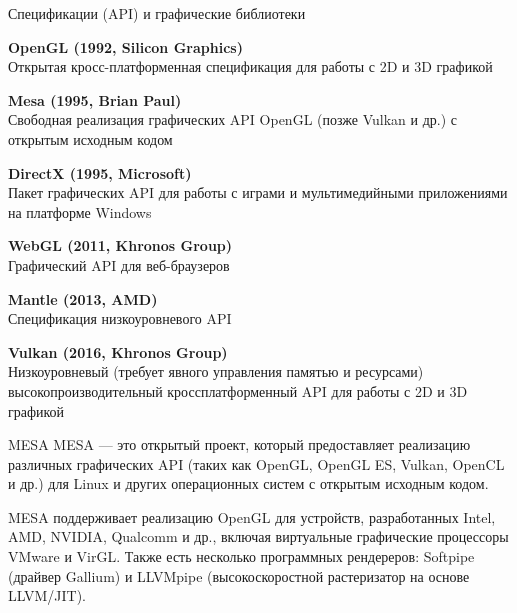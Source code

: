 \documentclass{beamer}
\begin{document}
\begin{frame}{Спецификации (API) и графические библиотеки}
	{\small
		\textbf{OpenGL (1992, Silicon Graphics)} \\
		Открытая кросс-платформенная спецификация для работы с 2D и 3D графикой

		\textbf{Mesa (1995, Brian Paul)} \\
		Свободная реализация графических API OpenGL (позже Vulkan и др.) с открытым исходным кодом

		\textbf{DirectX (1995, Microsoft)} \\
		Пакет графических API для работы с играми и мультимедийными приложениями на платформе Windows

		\textbf{WebGL (2011,	Khronos Group)} \\
		Графический API для веб-браузеров

		\textbf{Mantle (2013, AMD)} \\
		Спецификация низкоуровневого API

		\textbf{Vulkan (2016, Khronos Group)} \\
		Низкоуровневый (требует явного управления памятью и ресурсами) высокопроизводительный кроссплатформенный API для работы с 2D и 3D графикой
	}



\end{frame}

\begin{frame}{MESA}
	MESA --- это открытый проект, который предоставляет реализацию различных графических API (таких как OpenGL, OpenGL ES, Vulkan, OpenCL и др.) для Linux и других операционных систем с открытым исходным кодом.

	MESA поддерживает реализацию OpenGL для устройств, разработанных Intel, AMD, NVIDIA, Qualcomm и др., включая виртуальные графические процессоры VMware и VirGL.
	Также есть несколько программных рендереров: Softpipe (драйвер Gallium) и LLVMpipe (высокоскоростной растеризатор на основе LLVM/JIT).


\end{frame}
\end{document}
